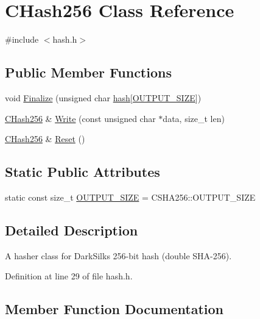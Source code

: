 \hypertarget{class_c_hash256}{}\section{C\+Hash256 Class Reference}
\label{class_c_hash256}


{\ttfamily \#include $<$hash.\+h$>$}

\subsection*{Public Member Functions}
\begin{DoxyCompactItemize}
\item 
void \hyperlink{class_c_hash256_aa8a70c1b7cf24ce7d00240a1131cf4e7}{Finalize} (unsigned char \hyperlink{cache_8cc_a11ecb029164e055f28f4123ce3748862}{hash}\mbox{[}\hyperlink{class_c_hash256_a6812a40441acb1c3b7f10c7e38c7d467}{O\+U\+T\+P\+U\+T\+\_\+\+S\+I\+Z\+E}\mbox{]})
\item 
\hyperlink{class_c_hash256}{C\+Hash256} \& \hyperlink{class_c_hash256_a9cc25033c6435cb28e2e8e377c949a7a}{Write} (const unsigned char $\ast$data, size\+\_\+t len)
\item 
\hyperlink{class_c_hash256}{C\+Hash256} \& \hyperlink{class_c_hash256_ab25b00e4cda7e209173f2ce90475953d}{Reset} ()
\end{DoxyCompactItemize}
\subsection*{Static Public Attributes}
\begin{DoxyCompactItemize}
\item 
static const size\+\_\+t \hyperlink{class_c_hash256_a6812a40441acb1c3b7f10c7e38c7d467}{O\+U\+T\+P\+U\+T\+\_\+\+S\+I\+Z\+E} = C\+S\+H\+A256\+::\+O\+U\+T\+P\+U\+T\+\_\+\+S\+I\+Z\+E
\end{DoxyCompactItemize}


\subsection{Detailed Description}
A hasher class for Dark\+Silk\textquotesingle{}s 256-\/bit hash (double S\+H\+A-\/256). 

Definition at line 29 of file hash.\+h.



\subsection{Member Function Documentation}
\hypertarget{class_c_hash256_aa8a70c1b7cf24ce7d00240a1131cf4e7}{}
